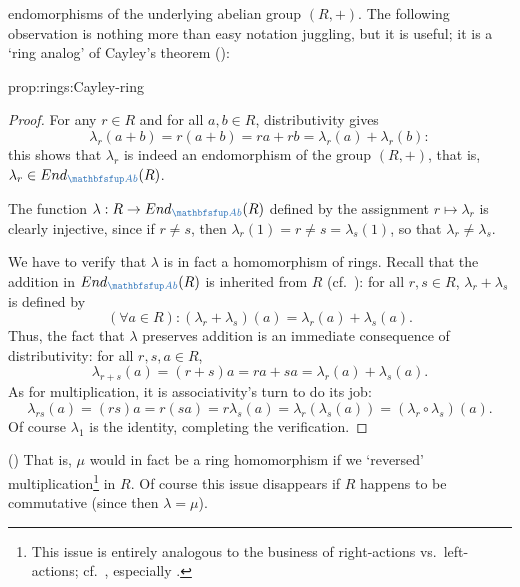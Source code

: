 endomorphisms of the underlying abelian group $(R, +)$. 
The following observation is nothing more than easy notation juggling,
but it is useful; it is a `ring analog' of Cayley's theorem
():
\begin{prop}{}{prop:rings:Cayley-ring}
\end{prop}
\begin{proof}
  For any $r \in R$ and for all $a, b \in R$, distributivity gives
  \[
    \lambda_r(a + b) = r(a + b) = ra + rb = \lambda_r(a) +
    \lambda_r(b):
  \]
  this shows that $\lambda_r$ is indeed an endomorphism of the group
  $(R, +)$, that is, $\lambda_r \in \End_{\categ{Ab}}(R)$.

  The function $\lambda : R \to \End_{\categ{Ab}}(R)$ defined by the
  assignment $r \mapsto \lambda_r$ is clearly injective, since if
  $r \neq s$, then $\lambda_r(1) = r \neq s = \lambda_s(1)$, so that
  $\lambda_r \neq \lambda_s$.

  We have to verify that $\lambda$ is in fact a homomorphism of
  rings. Recall that the addition in $\End_{\categ{Ab}}(R)$ is
  inherited from $R$ (cf.\
  ): for all
  $r, s \in R$, $\lambda_r + \lambda_s$ is defined by
  \[
    (\forall a \in R) : (\lambda_r + \lambda_s)(a) = \lambda_r(a) +
    \lambda_s(a).
  \]
  Thus, the fact that $\lambda$ preserves addition is an immediate
  consequence of distributivity: for all $r, s, a \in R$,
  \[
    \lambda_{r+s}(a) = (r + s)a = ra + sa = \lambda_r(a) +
    \lambda_s(a).
  \]
  As for multiplication, it is associativity's turn to do its job:
  \[
    \lambda_{rs}(a) = (rs)a = r(sa) = r\lambda_s(a) =
    \lambda_r(\lambda_s(a)) = (\lambda_r \circ \lambda_s)(a).
  \]
  Of course $\lambda_1$ is the identity, completing the verification.
\end{proof}
() That is, $\mu$ would in fact be a ring
homomorphism if we `reversed' multiplication\footnote{This issue is
  entirely analogous to the business of right-actions vs.\
  left-actions; cf.\
  ,
  especially \Cref{exer:groups:opposite-group}.} in $R$. Of course
this issue disappears if $R$ happens to be commutative (since then
$\lambda = \mu$).

